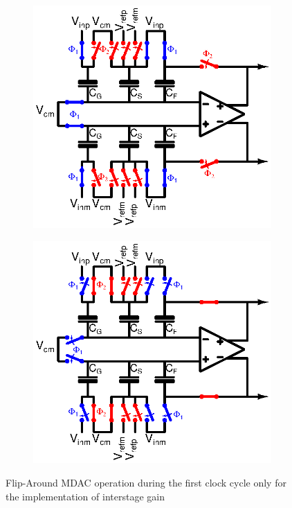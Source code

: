 \begin{figure}[htp]
	\centering
	\begin{subfigure}[b]{0.45\textwidth}
		\centering
		\includegraphics[width=\textwidth]{Chapter4/Figs/algorithmic-Cg-phi1.ps}
		\label{fig:algo-Cg-phi1}
	\end{subfigure}
	\begin{subfigure}[b]{0.45\textwidth}
		\centering
		\includegraphics[width=\textwidth]{Chapter4/Figs/algorithmic-Cg-phi2.ps}
		\label{fig:algo-Cg-phi2}
	\end{subfigure}
	\caption{Flip-Around MDAC operation during the first clock cycle only for the implementation of interstage gain}
	\label{fig:algo-mdac-cg}
\end{figure}

